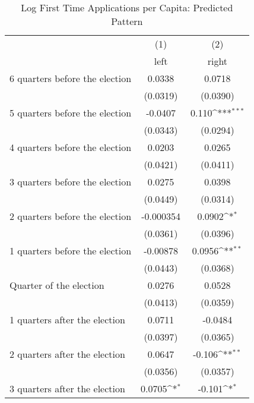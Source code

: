 \begin{table}[htbp]\centering
\def\sym#1{\ifmmode^{#1}\else\(^{#1}\)\fi}
\caption{Log First Time Applications per Capita: Predicted Pattern}
\begin{tabular}{l*{2}{c}}
\hline\hline
                    &\multicolumn{1}{c}{(1)}&\multicolumn{1}{c}{(2)}\\
                    &\multicolumn{1}{c}{left}&\multicolumn{1}{c}{right}\\
\hline
 6 quarters before the election&      0.0338         &      0.0718         \\
                    &    (0.0319)         &    (0.0390)         \\
[1em]
 5 quarters before the election&     -0.0407         &       0.110\sym{***}\\
                    &    (0.0343)         &    (0.0294)         \\
[1em]
 4 quarters before the election&      0.0203         &      0.0265         \\
                    &    (0.0421)         &    (0.0411)         \\
[1em]
 3 quarters before the election&      0.0275         &      0.0398         \\
                    &    (0.0449)         &    (0.0314)         \\
[1em]
 2 quarters before the election&   -0.000354         &      0.0902\sym{*}  \\
                    &    (0.0361)         &    (0.0396)         \\
[1em]
 1 quarters before the election&    -0.00878         &      0.0956\sym{**} \\
                    &    (0.0443)         &    (0.0368)         \\
[1em]
Quarter of the election&      0.0276         &      0.0528         \\
                    &    (0.0413)         &    (0.0359)         \\
[1em]
 1 quarters after the election&      0.0711         &     -0.0484         \\
                    &    (0.0397)         &    (0.0365)         \\
[1em]
 2 quarters after the election&      0.0647         &      -0.106\sym{**} \\
                    &    (0.0356)         &    (0.0357)         \\
[1em]
 3 quarters after the election&      0.0705\sym{*}  &      -0.101\sym{*}  \\

\end{tabular}
\end{table}
